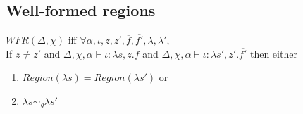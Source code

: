 \documentclass[format=acmsmall, authordraft, authorversion]{acmart}\settopmatter{printfolios=true,printccs=false,printacmref=false}
\newcommand{\seq}[1]{\overline{#1}}
\newcommand{\lambdas}{\lambda s}
\begin{document}
\subsection{Well-formed regions}
\parbox{\textwidth}{
$\textit{WFR}(\Delta, \chi)$ iff $\forall \alpha, \iota, z, z', \seq{f}, \seq{f'}, \lambda, \lambda'$,\\
If $z\neq z'$
and $\Delta, \chi, \alpha \vdash \iota : \lambdas, z . \seq{f}$
and $\Delta, \chi, \alpha \vdash \iota : \lambdas', z' . \seq{f'}$
then either
\begin{enumerate}
    \item $\mathit{Region}(\lambdas) = \mathit{Region}(\lambdas')$ or
    \item $\lambdas \sim_g \lambdas'$
\end{enumerate}
}
\end{document}
